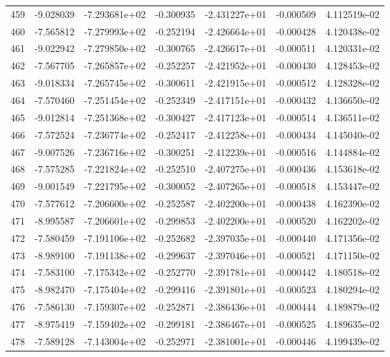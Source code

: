 \begin{tabular}{rrrrrrr}
 459 &  -9.028039 & -7.293681e+02 & -0.300935 & -2.431227e+01 &   -0.000509 &  4.112519e-02 \\
 460 &  -7.565812 & -7.279993e+02 & -0.252194 & -2.426664e+01 &   -0.000428 &  4.120438e-02 \\
 461 &  -9.022942 & -7.279850e+02 & -0.300765 & -2.426617e+01 &   -0.000511 &  4.120331e-02 \\
 462 &  -7.567705 & -7.265857e+02 & -0.252257 & -2.421952e+01 &   -0.000430 &  4.128453e-02 \\
 463 &  -9.018334 & -7.265745e+02 & -0.300611 & -2.421915e+01 &   -0.000512 &  4.128328e-02 \\
 464 &  -7.570460 & -7.251454e+02 & -0.252349 & -2.417151e+01 &   -0.000432 &  4.136650e-02 \\
 465 &  -9.012814 & -7.251368e+02 & -0.300427 & -2.417123e+01 &   -0.000514 &  4.136511e-02 \\
 466 &  -7.572524 & -7.236774e+02 & -0.252417 & -2.412258e+01 &   -0.000434 &  4.145040e-02 \\
 467 &  -9.007526 & -7.236716e+02 & -0.300251 & -2.412239e+01 &   -0.000516 &  4.144884e-02 \\
 468 &  -7.575285 & -7.221824e+02 & -0.252510 & -2.407275e+01 &   -0.000436 &  4.153618e-02 \\
 469 &  -9.001549 & -7.221795e+02 & -0.300052 & -2.407265e+01 &   -0.000518 &  4.153447e-02 \\
 470 &  -7.577612 & -7.206600e+02 & -0.252587 & -2.402200e+01 &   -0.000438 &  4.162390e-02 \\
 471 &  -8.995587 & -7.206601e+02 & -0.299853 & -2.402200e+01 &   -0.000520 &  4.162202e-02 \\
 472 &  -7.580459 & -7.191106e+02 & -0.252682 & -2.397035e+01 &   -0.000440 &  4.171356e-02 \\
 473 &  -8.989100 & -7.191138e+02 & -0.299637 & -2.397046e+01 &   -0.000521 &  4.171150e-02 \\
 474 &  -7.583100 & -7.175342e+02 & -0.252770 & -2.391781e+01 &   -0.000442 &  4.180518e-02 \\
 475 &  -8.982470 & -7.175404e+02 & -0.299416 & -2.391801e+01 &   -0.000523 &  4.180294e-02 \\
 476 &  -7.586130 & -7.159307e+02 & -0.252871 & -2.386436e+01 &   -0.000444 &  4.189879e-02 \\
 477 &  -8.975419 & -7.159402e+02 & -0.299181 & -2.386467e+01 &   -0.000525 &  4.189635e-02 \\
 478 &  -7.589128 & -7.143004e+02 & -0.252971 & -2.381001e+01 &   -0.000446 &  4.199439e-02 \\

\end{tabular}
